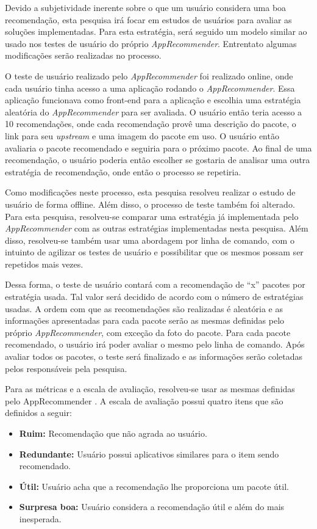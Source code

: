 Devido a subjetividade inerente sobre o que um usuário considera uma boa
recomendação, esta pesquisa irá focar em estudos de usuários para
avaliar as soluções implementadas. Para esta estratégia, será seguido um modelo
similar ao usado nos testes de usuário do próprio \textit{AppRecommender}. Entrentato
algumas modificações serão realizadas no processo.

O teste de usuário realizado pelo \textit{AppRecommender} foi realizado online, onde cada
usuário tinha acesso a uma aplicação rodando o \textit{AppRecommender}. Essa aplicação
funcionava como front-end para a aplicação e escolhia uma estratégia aleatória
do \textit{AppRecommender} para ser avaliada. O usuário então teria acesso a 10
recomendações, onde cada recomendação provê uma descrição do
pacote, o link para seu \textit{upstream} e uma imagem do pacote em uso. O
usuário então avaliaria o pacote recomendado e seguiria para o próximo pacote.
Ao final de uma recomendação, o usuário poderia então escolher se gostaria de
analisar uma outra estratégia de recomendação, onde então o processo se
repetiria.

Como modificações neste processo, esta pesquisa resolveu realizar o estudo de
usuário de forma offline. Além disso, o processo de teste também foi alterado.
Para esta pesquisa, resolveu-se comparar uma estratégia já implementada pelo
\textit{AppRecommender} com as outras estratégias implementadas nesta pesquisa.
Além disso, resolveu-se também usar uma abordagem por linha de
comando, com o intuinto de agilizar os testes de usuário e possibilitar que os
mesmos possam ser repetidos mais vezes.

Dessa forma, o teste de usuário contará com a recomendação de ``x'' pacotes por
estratégia usada. Tal valor será decidido de acordo com o número de estratégias
usadas. A ordem com que
as recomendações são realizadas é aleatória e as informações apresentadas
para cada pacote serão as mesmas definidas pelo próprio \textit{AppRecommender}, com
exceção da foto do pacote. Para cada pacote recomendado, o usuário irá poder
avaliar o mesmo pelo linha de comando. Após avaliar todos os pacotes, o teste
será finalizado e as informações serão coletadas pelos responsáveis pela
pesquisa.

Para as métricas e a escala de avaliação, resolveu-se usar as mesmas definidas
pelo AppRecommender \cite{araujo2011apprecommender}. A escala de avaliação
possui quatro itens que são definidos a seguir:

\begin{itemize}
    \item \textbf{Ruim: } Recomendação que não agrada ao usuário.
    \item \textbf{Redundante: } Usuário possui aplicativos similares para o item
        sendo recomendado.
    \item \textbf{Útil: } Usuário acha que a recomendação lhe proporciona um
            pacote útil.
    \item \textbf{Surpresa boa: } Usuário considera a recomendação útil e além
        do mais inesperada.
\end{itemize}

